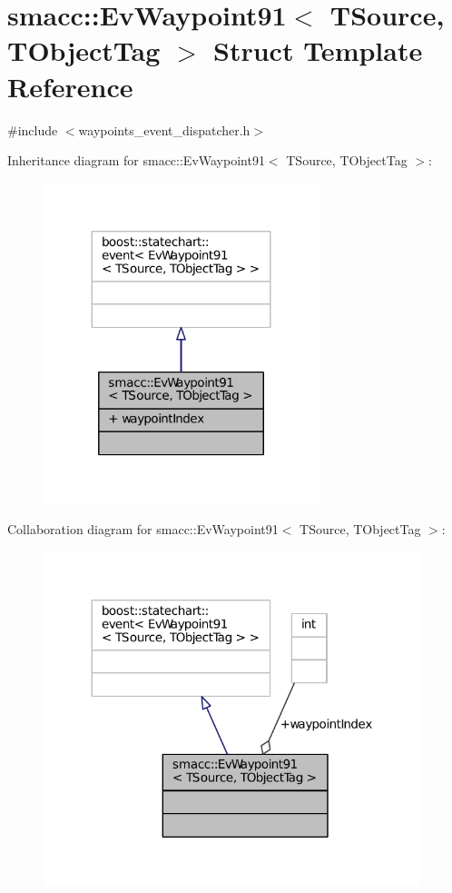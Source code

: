 \hypertarget{structsmacc_1_1EvWaypoint91}{}\section{smacc\+:\+:Ev\+Waypoint91$<$ T\+Source, T\+Object\+Tag $>$ Struct Template Reference}
\label{structsmacc_1_1EvWaypoint91}


{\ttfamily \#include $<$waypoints\+\_\+event\+\_\+dispatcher.\+h$>$}



Inheritance diagram for smacc\+:\+:Ev\+Waypoint91$<$ T\+Source, T\+Object\+Tag $>$\+:
\nopagebreak
\begin{figure}[H]
\begin{center}
\leavevmode
\includegraphics[width=227pt]{structsmacc_1_1EvWaypoint91__inherit__graph}
\end{center}
\end{figure}


Collaboration diagram for smacc\+:\+:Ev\+Waypoint91$<$ T\+Source, T\+Object\+Tag $>$\+:
\nopagebreak
\begin{figure}[H]
\begin{center}
\leavevmode
\includegraphics[width=312pt]{structsmacc_1_1EvWaypoint91__coll__graph}
\end{center}
\end{figure}
